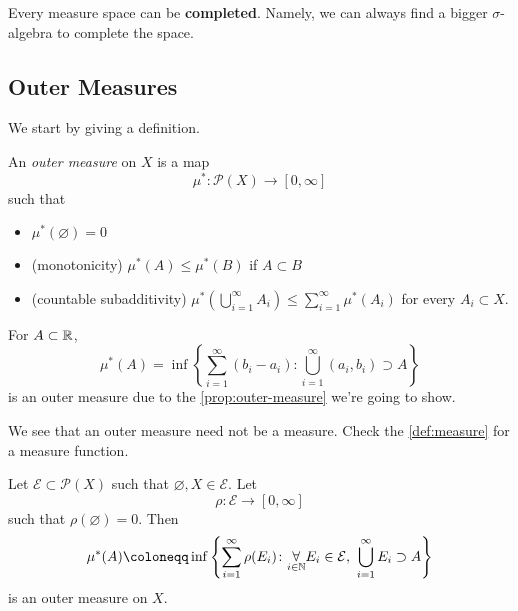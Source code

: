 \begin{exercise}
	Every measure space can be \textbf{completed}. Namely, we can always find a bigger \(\sigma\)-algebra to complete the space.
\end{exercise}

\subsection{Outer Measures}
We start by giving a definition.

\begin{definition}\label{def:outer-measure}
	An \emph{outer measure} on \(X\) is a map
	\[
		\mu^{*} \colon \mathcal{P} (X)\to [0, \infty ]
	\]
	such that
	\begin{itemize}
		\item\label{def:outer-measure-empty-measure} \(\mu^{*} (\varnothing ) = 0\)
		\item\label{def:outer-measure-montonicity} (monotonicity) \(\mu^{*} (A)\leq \mu^{*} (B)\) if \(A\subset B\)
		\item\label{def:outer-measure-countable-subadditivity} (countable subadditivity) \(\mu^{*} \left(\bigcup\limits_{i=1}^{\infty} A_{i}\right) \leq \sum\limits_{i=1}^{\infty} \mu^{*} (A_{i})\) for every \(A_{i} \subset X \).
	\end{itemize}
\end{definition}

\begin{eg}
	For \(A\subset\mathbb{\MakeUppercase{R}} \),
	\[
		\mu^{*} (A) = \inf \left\{\sum\limits_{i=1}^{\infty} (b_{i} - a_{i}) \colon \bigcup\limits_{i=1}^{\infty} (a_{i}, b_{i})\supset A\right\}
	\]
	is an outer measure due to the \autoref{prop:outer-measure} we're going to show.
\end{eg}

\begin{remark}
	We see that an outer measure need not be a measure. Check the \autoref{def:measure} for a measure function.
\end{remark}

\begin{proposition}\label{prop:outer-measure}
	Let \(\mathcal{E} \subset \mathcal{P} (X)\) such that \(\varnothing, X \in  \mathcal{E} \). Let
	\[
		\rho\colon \mathcal{E} \to [0, \infty ]
	\]
	such that \(\rho(\varnothing ) = 0\). Then
	\[
		\mu^{*} (A) \coloneqq \inf\left\{\sum\limits_{i=1}^{\infty} \rho(E_{i})\colon \underset{i\in \mathbb{\MakeUppercase{N}} }{\forall}E_{i}\in \mathcal{E},\ \bigcup\limits_{i=1}^{\infty} E_{i}\supset A\right\}
	\]
	is an outer measure on \(X\).
\end{proposition}

